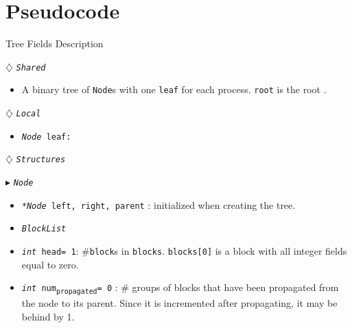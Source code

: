 \documentclass[10pt]{article}
\newcommand{\sub}[1]{\textsubscript{#1}}
\renewcommand{\tt}[1]{\texttt{#1}}
\renewcommand{\sl}[1]{\textsl{#1}}
\renewcommand{\bf}[1]{\textbf{#1}}
\newcommand{\nf}[1]{{\normalfont{\texttt{#1}}}}
\newcommand{\head}{head}
\theoremstyle{definition}
\begin{document}
\section{Pseudocode}

\begin{algorithm}
\caption{Tree Fields Description}
\begin{algorithmic}[1]
\setcounter{ALG@line}{100}
\begin{multicols}{2}


\Statex $\diamondsuit$ \tt{\sl{Shared}}
\begin{itemize}
\item \textsf{A binary tree of \tt{Node}s with one \tt{leaf} for each process. \tt{root} is the root \nf{node}.}
\end{itemize}

\Statex

\Statex $\diamondsuit$ \tt{\sl{Local}}
\begin{itemize}
\item \tt{\sl{Node} leaf:} 
\end{itemize}

\Statex
\Statex $\diamondsuit$ \tt{\sl{Structures}}

\Statex $\blacktriangleright$ \tt{\sl{Node}}
\begin{itemize}
\item \tt{\sl{*Node} left, right, parent} \textsf{: initialized  when creating the tree.}
\item \tt{\sl{BlockList}}
\item \tt{\sl{int} \head= 1}\textsf{: \#\tt{block}s in \tt{blocks}. \tt{blocks[0]} is a block with all integer fields equal to zero.}
\item \tt{\sl{int} num\sub{propagated}= 0}\textsf{} \textsf{: \# groups of blocks that have been propagated from the node to its parent. Since it is incremented after propagating, it may be behind by 1.}
\end{itemize}

%  
%
%  


\end{multicols}
\end{algorithmic}
\end{algorithm}
\end{document}
